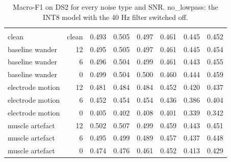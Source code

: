 \begin{table}[H]
  \centering
  \caption{Macro-F1 on DS2 for every noise type and SNR. no\_lowpass: the INT8 model with the 40 Hz filter switched off.}
  \label{tab:noise-by-type}
  \begin{tabularx}{\linewidth}{lRRRRRRR}
     &  &  &  &  &  &  &  \\
    clean & clean & 0.493 & 0.505 & 0.497 & 0.461 & 0.445 & 0.452 \\
    baseline wander & 12 & 0.495 & 0.505 & 0.497 & 0.461 & 0.445 & 0.454 \\
    baseline wander & 6 & 0.496 & 0.504 & 0.499 & 0.461 & 0.443 & 0.455 \\
    baseline wander & 0 & 0.499 & 0.504 & 0.500 & 0.460 & 0.444 & 0.459 \\
    electrode motion & 12 & 0.481 & 0.484 & 0.484 & 0.452 & 0.420 & 0.437 \\
    electrode motion & 6 & 0.452 & 0.454 & 0.454 & 0.436 & 0.386 & 0.404 \\
    electrode motion & 0 & 0.405 & 0.402 & 0.408 & 0.401 & 0.339 & 0.342 \\
    muscle artefact & 12 & 0.502 & 0.507 & 0.499 & 0.459 & 0.443 & 0.451 \\
    muscle artefact & 6 & 0.495 & 0.499 & 0.489 & 0.457 & 0.437 & 0.448 \\
    muscle artefact & 0 & 0.474 & 0.476 & 0.461 & 0.452 & 0.413 & 0.429 \\
    \bottomrule
  \end{tabularx}
\end{table}
